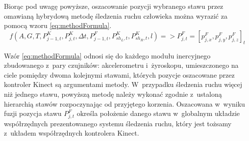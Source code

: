 Biorąc pod uwagę powyższe, oszacowanie pozycji wybranego stawu przez omawianą hybrydową metodę śledzenia ruchu człowieka można wyrazić za pomocą wzoru \eqref{eq:methodFormula}.
\begin{equation}
	f(A,G,T,P_{j-1,t}^K,P_{j,t}^K,\Delta t, P^F_{j-1,t}, P^K_{sh_L,t},P^K_{sh_R,t},l) => P^F_{j,t} = [p_{j,x}^F,p_{j,y}^F,p_{j,z}^F]_t
	\label{eq:methodFormula}
\end{equation}


Wzór \eqref{eq:methodFormula} odnosi się do każdego modułu inercyjnego zbudowanego z~pary czujników: akcelerometru i~żyroskopu, umieszczonego na ciele pomiędzy dwoma kolejnymi stawami, których pozycje oszacowane przez kontroler Kinect są argumentami metody. W~przypadku śledzenia ruchu więcej niż jednego stawu, powyższą metodę należy wykonać zgodnie z~ustaloną hierarchią stawów rozpoczynając od przyjętego korzenia. Oszacowana w~wyniku fuzji pozycja stawu $P^F_{j,t}$ określa położenie danego stawu w~globalnym układzie współrzędnych prezentowanego systemu śledzenia ruchu, który jest tożsamy z~układem współrzędnych kontrolera Kinect.

